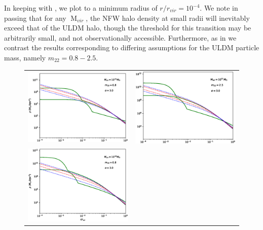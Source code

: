 \documentclass[a4paper,11pt]{article}
\begin{document}
In keeping with \cite{Robles:2018fur}, we plot to a minimum radius of $r/r_{vir} = 10^{-4}$. We note in passing that for any $\operatorname{M}_{vir}$, the NFW halo density at small radii will inevitably exceed that of the ULDM halo, though the threshold for this transition may be arbitrarily small, and not observationally accessible. Furthermore, as in \cite{Robles:2018fur} we contrast the  results corresponding to differing assumptions for the ULDM particle mass, namely $m_{22} = 0.8 - 2.5$.



\begin{figure}
\begin{tabular}{cc}
{\includegraphics[width = 3.1in, trim={2.1cm 0.5cm 0cm 0.5cm}]{pics/11_8_3.eps}} &
{\includegraphics[width = 3.1in, trim={2.1cm 0.5cm 0cm 0.5cm}]{pics/11_25_3.eps}}\\
{\includegraphics[width = 3.1in, trim={2.1cm 0.5cm 0cm 0.5cm}]{pics/12_8_3.eps}} &

\end{tabular}
\end{figure}
\end{document}
